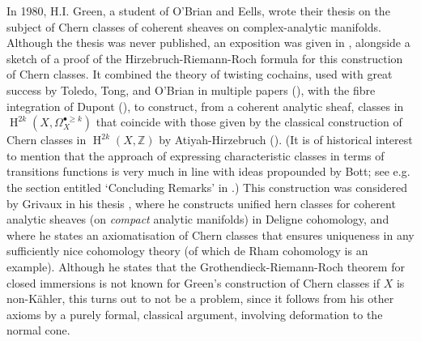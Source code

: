 \documentclass[11pt,fleqn]{article}
\theoremstyle{plain}
\theoremstyle{definition}
\theoremstyle{remark}
\numberwithin{equation}{theorem}
\DeclareMathOperator{\HH}{H}
\begin{document}
    In 1980, H.I. Green, a student of O'Brian and Eells, wrote their thesis \cite{Green1980} on the subject of Chern classes of coherent sheaves on complex-analytic manifolds.
    Although the thesis was never published, an exposition was given in \cite{Toledo&Tong1986}, alongside a sketch of a proof of the Hirzebruch-Riemann-Roch formula for this construction of Chern classes.
    It combined the theory of {twisting cochains}, used with great success by Toledo, Tong, and O'Brian in multiple papers (\cite{Toledo&Tong1976,Toledo&Tong1978,OBrian&etal1981,OBrian&etal1985}), with the {fibre integration} of Dupont (\cite{Dupont1976}), to construct, from a coherent analytic sheaf, classes in $\HH^{2k}(X,\Omega_X^{\bullet\geqslant k})$ that coincide with those given by the classical construction of Chern classes in $\HH^{2k}(X,\mathbb{Z})$ by Atiyah-Hirzebruch (\cite{Atiyah&Hirzebruch1962}).
    (It is of historical interest to mention that the approach of expressing characteristic classes in terms of transitions functions is very much in line with ideas propounded by Bott; see e.g. the section entitled `Concluding Remarks' in \cite[§23]{Bott&Tu1982}.)
    This construction was considered by Grivaux in his thesis \cite{Grivaux2009}, where he constructs unified hern classes for coherent analytic sheaves (on \emph{compact} analytic manifolds) in Deligne cohomology, and where he states an axiomatisation of Chern classes that ensures uniqueness in any sufficiently nice cohomology theory (of which de Rham cohomology is an example).
    Although he states that the Grothendieck-Riemann-Roch theorem for closed immersions is not known for Green's construction of Chern classes if $X$ is non-Kähler, this turns out to not be a problem, since it follows from his other axioms by a purely formal, classical argument, involving deformation to the normal cone.
\end{document}
